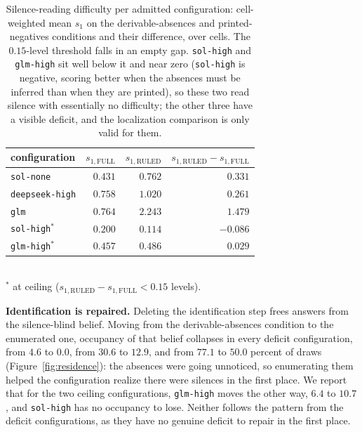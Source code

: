 \documentclass{article}
\theoremstyle{plain}
\theoremstyle{definition}
\theoremstyle{remark}
\begin{document}
\begin{table}[H]
  \caption{Silence-reading difficulty per admitted configuration: cell-weighted
  mean $s_1$ on the derivable-absences and printed-negatives conditions and their
  difference, over cells. The $0.15$-level threshold
  falls in an empty gap. \texttt{sol-high} and \texttt{glm-high} sit well below it
  and near zero (\texttt{sol-high} is negative, scoring better when the absences
  must be inferred than when they are printed), so these two read silence with
  essentially no difficulty; the other three have a visible deficit, and the
  localization comparison is only valid for them.}
  \label{tab:ceiling}
  \centering
  \small
  \begin{tabular}{lrrr}
    \toprule
    configuration & $s_{1,\mathrm{FULL}}$ & $s_{1,\mathrm{RULED}}$ &
      $s_{1,\mathrm{RULED}} - s_{1,\mathrm{FULL}}$ \\
    \midrule
    \texttt{sol-none}      & $0.431$ & $0.762$ & $0.331$ \\
    \texttt{deepseek-high} & $0.758$ & $1.020$ & $0.261$ \\
    \texttt{glm}           & $0.764$ & $2.243$ & $1.479$ \\
    \midrule
    \texttt{sol-high}$^{\ast}$ & $0.200$ & $0.114$ & $-0.086$ \\
    \texttt{glm-high}$^{\ast}$ & $0.457$ & $0.486$ & $0.029$ \\
    \bottomrule
  \end{tabular}\\[2pt]
  {\footnotesize $^{\ast}$ at ceiling
  ($s_{1,\mathrm{RULED}} - s_{1,\mathrm{FULL}} < 0.15$ levels).}
\end{table}



\textbf{Identification is repaired.} Deleting the identification step frees answers from the silence-blind belief.
Moving from the derivable-absences condition to the enumerated one, occupancy of
that belief collapses in every deficit configuration, from $4.6$ to $0.0$, from
$30.6$ to $12.9$, and from $77.1$ to $50.0$ percent of draws (Figure~\ref{fig:residence}): the absences were
going unnoticed, so enumerating them helped the configuration realize there were silences 
in the first place. We report that for the two ceiling configurations,
\texttt{glm-high} moves the other way, $6.4$ to $10.7$, and \texttt{sol-high}
has no occupancy to lose. Neither follows the pattern from the deficit configurations, as
they have no genuine deficit to repair in the first place. 
\end{document}
